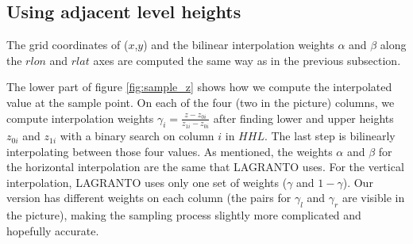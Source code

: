 

\subsection{Using adjacent level heights}\label{sec:zsampling_mine}
The grid coordinates of ($x$,$y$) and the bilinear interpolation weights $\alpha$ and $\beta$ along the $rlon$ and $rlat$ axes are computed the same way as in the previous subsection.

The lower part of figure \ref{fig:sample_z} shows how we compute the interpolated value at the sample point. On each of the four (two in the picture) columns, we compute interpolation weights $\gamma_i = \frac{z-z_{0i}}{z_{1i}-z_{0i}}$ after finding lower and upper heights $z_{0i}$ and $z_{1i}$ with a binary search on column $i$ in $HHL$. The last step is bilinearly interpolating between those four values. As mentioned, the weights $\alpha$ and $\beta$ for the horizontal interpolation are the same that LAGRANTO uses. For the vertical interpolation, LAGRANTO uses only one set of weights ($\gamma$ and $1-\gamma$). Our version has different weights on each column (the pairs for $\gamma_l$ and $\gamma_r$ are visible in the picture), making the sampling process slightly more complicated and hopefully accurate.

